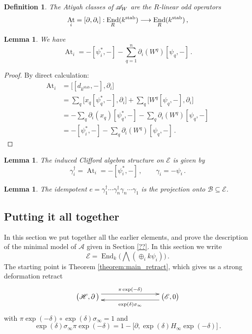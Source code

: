 \documentclass[english,letter paper,12pt,leqno]{article}
\newtheorem{lemma}[theorem]{Lemma}
\theoremstyle{example}
\newtheorem{definition}[theorem]{Definition}
\numberwithin{equation}{section}
\def\stab{\operatorname{stab}}
\def\be{\begin{equation}}
\def\ee{\end{equation}}
\DeclareMathOperator{\End}{End}
\DeclareMathOperator{\At}{At}
\begin{document}
\begin{definition}
The Atiyah classes of $\mathscr{A}_W$ are the $R$-linear odd operators
\[
\At_i = [\partial, \partial_{i}]: \End_R(k^{\stab}) \lto \End_R(k^{\stab})\,,
\]
\end{definition}

\begin{lemma} We have
\[
\At_i = -[\psi_i^*, -] - \sum_{q=1}^n \partial_{i}(W^q) [ \psi_q, - ]\,.
\]
\end{lemma}
\begin{proof}
By direct calculation:
\begin{align*}
\At_i &= \big[ [d_{k^{\stab}},-], \partial_{i} \big]\\
&= \sum_q \big[x_q [\psi_q^*,-], \partial_{i}\big] + \sum_q \big[W^q [\psi_q,-], \partial_{i}\big]\\
&= -\sum_q \partial_{i}(x_q) [\psi_q^*,-] - \sum_q \partial_{i}(W^q) [\psi_q,-]\\
&= -[\psi_i^*,-] - \sum_q \partial_{i}(W^q) [\psi_q, -]\,.
\end{align*}
\end{proof}

\begin{lemma} The induced Clifford algebra structure on $\mathscr{E}$ is given by
\[
\gamma_i^\dagger = \At_i = -[\psi_i^*, -]\,, \qquad \gamma_i = -\psi_i\,.
\]
\end{lemma}

\begin{lemma} The idempotent $e = \gamma_1^\dagger \cdots \gamma_n^\dagger \gamma_n \cdots \gamma_1$ is the projection onto $\mathscr{B} \subseteq \mathscr{E}$.
\end{lemma}


\subsection{Putting it all together}

In this section we put together all the earlier elements, and prove the description of the minimal model of $\mathscr{A}$ given in Section \ref{??}. In this section we write
\[
\mathscr{E} = \End_k\Big( \bigwedge( \oplus_i k \psi_i ) \Big)\,.
\]
The starting point is Theorem \ref{theorem:main_retract}, which gives us a strong deformation retract
\be\label{eq:ho_retract_for_mm}
\xymatrix@C+5pc{
\big( \mathscr{H}, \partial \,\big) \ar@<1ex>[r]^-{\pi\exp(-\delta)} & \big( \mathscr{E}, 0 \big) \ar@<1ex>[l]^-{ \exp(\delta)\sigma_\infty }
}
\ee
with $\pi \exp(-\delta) \circ \exp(\delta) \sigma_\infty = 1$ and
\[
\exp(\delta)\sigma_\infty \pi\exp(-\delta) = 1 - \big[ \partial, \exp(\delta) H_\infty \exp(-\delta) \big]\,.
\]
\end{document}
